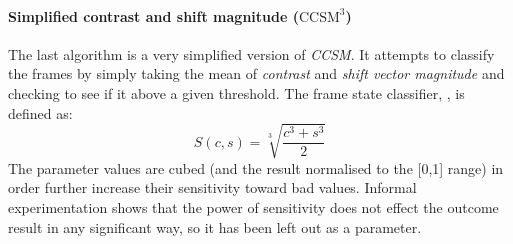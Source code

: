 \paragraph{Simplified contrast and shift magnitude ($\text{CCSM}^{3}$)}
%
The last algorithm is a very simplified version of \textit{CCSM}. It attempts to classify the frames by simply taking the mean of \textit{contrast} and \textit{shift vector magnitude} and checking to see if it above a given threshold. The frame state classifier, , is defined as:
\[
S(c,s)=\sqrt[3]{\frac{c^{3}+s^{3}}{2}}
\]
The parameter values are cubed (and the result normalised to the [0,1] range) in order further increase their sensitivity toward bad values. Informal experimentation shows that the power of sensitivity does not effect the outcome result in any significant way, so it has been left out as a parameter.
%
